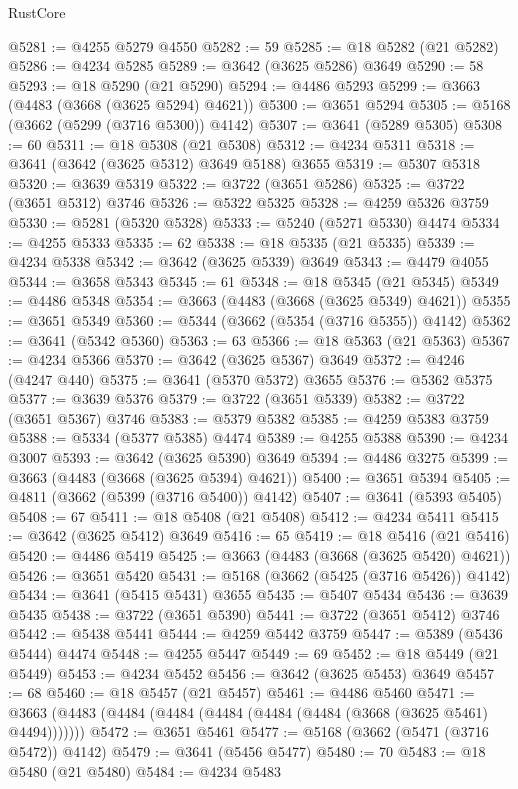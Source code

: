 \begin{lexlean}{RustCore}
\begin{coremodule}
@5281 := @4255 @5279 @4550
@5282 := 59
@5285 := @18 @5282 (@21 @5282)
@5286 := @4234 @5285
@5289 := @3642 (@3625 @5286) @3649
@5290 := 58
@5293 := @18 @5290 (@21 @5290)
@5294 := @4486 @5293
@5299 := @3663 (@4483 (@3668 (@3625 @5294) @4621))
@5300 := @3651 @5294
@5305 := @5168 (@3662 (@5299 (@3716 @5300)) @4142)
@5307 := @3641 (@5289 @5305)
@5308 := 60
@5311 := @18 @5308 (@21 @5308)
@5312 := @4234 @5311
@5318 := @3641 (@3642 (@3625 @5312) @3649 @5188) @3655
@5319 := @5307 @5318
@5320 := @3639 @5319
@5322 := @3722 (@3651 @5286)
@5325 := @3722 (@3651 @5312) @3746
@5326 := @5322 @5325
@5328 := @4259 @5326 @3759
@5330 := @5281 (@5320 @5328)
@5333 := @5240 (@5271 @5330) @4474
@5334 := @4255 @5333
@5335 := 62
@5338 := @18 @5335 (@21 @5335)
@5339 := @4234 @5338
@5342 := @3642 (@3625 @5339) @3649
@5343 := @4479 @4055
@5344 := @3658 @5343
@5345 := 61
@5348 := @18 @5345 (@21 @5345)
@5349 := @4486 @5348
@5354 := @3663 (@4483 (@3668 (@3625 @5349) @4621))
@5355 := @3651 @5349
@5360 := @5344 (@3662 (@5354 (@3716 @5355)) @4142)
@5362 := @3641 (@5342 @5360)
@5363 := 63
@5366 := @18 @5363 (@21 @5363)
@5367 := @4234 @5366
@5370 := @3642 (@3625 @5367) @3649
@5372 := @4246 (@4247 @440)
@5375 := @3641 (@5370 @5372) @3655
@5376 := @5362 @5375
@5377 := @3639 @5376
@5379 := @3722 (@3651 @5339)
@5382 := @3722 (@3651 @5367) @3746
@5383 := @5379 @5382
@5385 := @4259 @5383 @3759
@5388 := @5334 (@5377 @5385) @4474
@5389 := @4255 @5388
@5390 := @4234 @3007
@5393 := @3642 (@3625 @5390) @3649
@5394 := @4486 @3275
@5399 := @3663 (@4483 (@3668 (@3625 @5394) @4621))
@5400 := @3651 @5394
@5405 := @4811 (@3662 (@5399 (@3716 @5400)) @4142)
@5407 := @3641 (@5393 @5405)
@5408 := 67
@5411 := @18 @5408 (@21 @5408)
@5412 := @4234 @5411
@5415 := @3642 (@3625 @5412) @3649
@5416 := 65
@5419 := @18 @5416 (@21 @5416)
@5420 := @4486 @5419
@5425 := @3663 (@4483 (@3668 (@3625 @5420) @4621))
@5426 := @3651 @5420
@5431 := @5168 (@3662 (@5425 (@3716 @5426)) @4142)
@5434 := @3641 (@5415 @5431) @3655
@5435 := @5407 @5434
@5436 := @3639 @5435
@5438 := @3722 (@3651 @5390)
@5441 := @3722 (@3651 @5412) @3746
@5442 := @5438 @5441
@5444 := @4259 @5442 @3759
@5447 := @5389 (@5436 @5444) @4474
@5448 := @4255 @5447
@5449 := 69
@5452 := @18 @5449 (@21 @5449)
@5453 := @4234 @5452
@5456 := @3642 (@3625 @5453) @3649
@5457 := 68
@5460 := @18 @5457 (@21 @5457)
@5461 := @4486 @5460
@5471 := @3663 (@4483 (@4484 (@4484 (@4484 (@4484 (@4484 (@3668 (@3625 @5461) @4494)))))))
@5472 := @3651 @5461
@5477 := @5168 (@3662 (@5471 (@3716 @5472)) @4142)
@5479 := @3641 (@5456 @5477)
@5480 := 70
@5483 := @18 @5480 (@21 @5480)
@5484 := @4234 @5483

\end{coremodule}
\end{lexlean}
